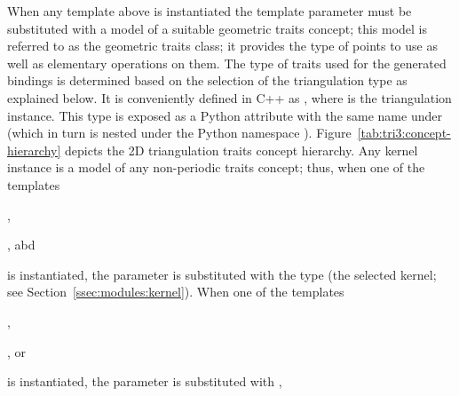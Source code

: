 When any template above is instantiated the template parameter  must be substituted with a model of a suitable geometric traits concept; this model is referred to as the geometric traits class; it provides the type of points to use as well as elementary operations on them. The type of traits used for the generated bindings is determined based on the selection of the triangulation type as explained below. It is conveniently defined in C++ as , where  is the triangulation instance. This type is exposed as a Python attribute with the same name under  (which in turn is nested under the Python namespace ). Figure~\ref{tab:tri3:concept-hierarchy} depicts the 2D triangulation traits concept hierarchy. Any kernel instance is a model of any non-periodic traits concept; thus, when one of the templates
\begin{compactenum}
\item {},
\item {}, abd
\item {}
\end{compactenum}
is instantiated, the  parameter is substituted with the  type (the selected kernel; see Section~\ref{ssec:modules:kernel}). When one of the templates
\begin{compactenum}
\item {},
\item {}, or
\item {}
\end{compactenum}
is instantiated, the  parameter is substituted
with ,
